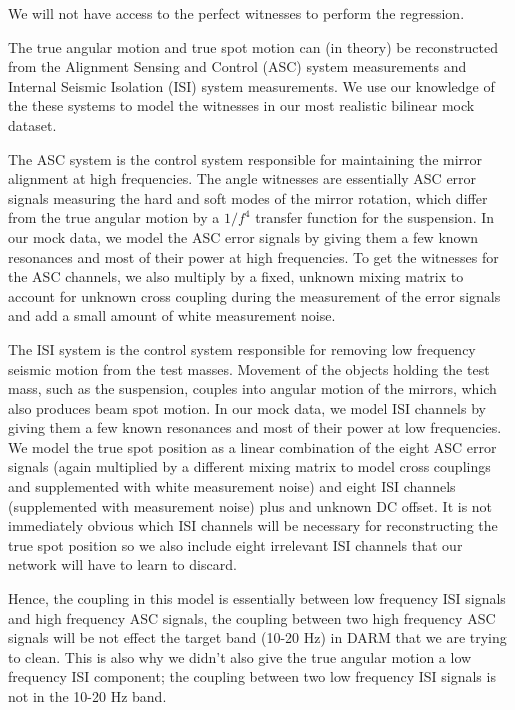 \begin{refsection}
We will not have access to the perfect witnesses to perform the regression.

The true angular motion and true spot motion can (in theory) be reconstructed from the Alignment Sensing and Control (ASC) system measurements and Internal Seismic Isolation (ISI) system measurements. We use our knowledge of the these systems to model the witnesses in our most realistic bilinear mock dataset.

The ASC system is the control system responsible for maintaining the mirror alignment at high frequencies. The angle witnesses are essentially ASC error signals measuring the hard and soft modes of the mirror rotation, which differ from the true angular motion by  a $1/f^4$ transfer function for the suspension. In our mock data, we model the ASC error signals by giving them a few known resonances and most of their power at high frequencies. To get the witnesses for the ASC channels, we also multiply by a fixed, unknown mixing matrix to account for unknown cross coupling during the measurement of the error signals and add a small amount of white measurement noise.

The ISI system is the control system responsible for removing low frequency seismic motion from the test masses. Movement of the objects holding the test mass, such as the suspension, couples into angular motion of the mirrors, which also produces beam spot motion. In our mock data, we model ISI channels by giving them a few known resonances and most of their power at low frequencies. We model the true spot position as a linear combination of the eight ASC error signals (again multiplied by a different mixing matrix to model cross couplings and supplemented with white measurement noise) and eight ISI channels (supplemented with measurement noise) plus and unknown DC offset. It is not immediately obvious which ISI channels will be necessary for reconstructing the true spot position so we also include eight irrelevant ISI channels that our network will have to learn to discard.

Hence, the coupling in this model is essentially between low frequency ISI signals and high frequency ASC signals, the coupling between two high frequency ASC signals will be not effect the target band (10-20 Hz) in DARM that we are trying to clean. This is also why we didn't also give the true angular motion a low frequency ISI component; the coupling between two low frequency ISI signals is not in the 10-20 Hz band.




\end{refsection}

